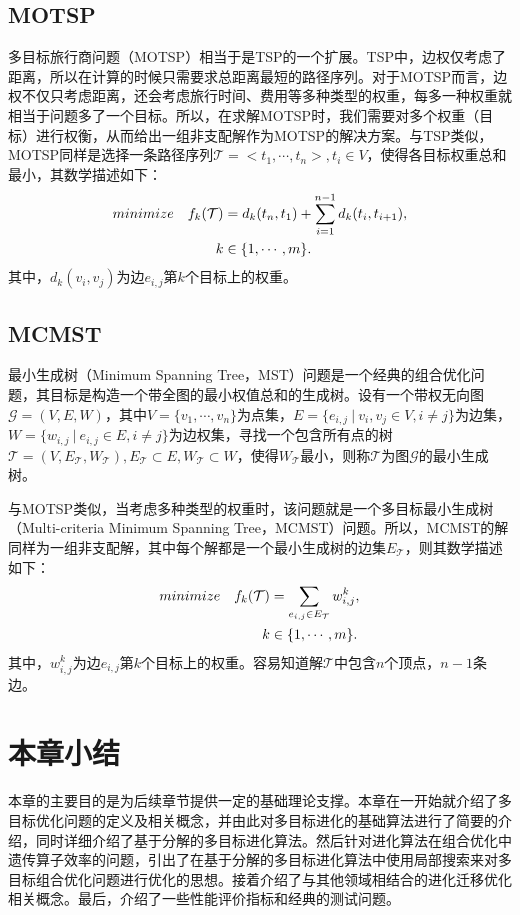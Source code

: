 \subsection{MOTSP}
\label{subsec:背景介绍:测试问题:MOTSP}
多目标旅行商问题（MOTSP）相当于是TSP的一个扩展。TSP中，边权仅考虑了距离，所以在计算的时候只需要求总距离最短的路径序列。对于MOTSP而言，边权不仅只考虑距离，还会考虑旅行时间、费用等多种类型的权重，每多一种权重就相当于问题多了一个目标。所以，在求解MOTSP时，我们需要对多个权重（目标）进行权衡，从而给出一组非支配解作为MOTSP的解决方案。与TSP类似，MOTSP同样是选择一条路径序列$\mathcal{T} = <t_1, \cdots, t_n>, t_i \in V $，使得各目标权重总和最小，其数学描述如下：
\begin{align}
    \label{eq:MOTSP}
    minimize \quad f_k(\mathcal{T}) & = d_k(t_n,t_1) + \sum_{i=1}^{n-1} d_k(t_i,t_{i+1}), \\
    k & \in \{1, \cdots, m\}. \notag
\end{align}
其中，$d_k(v_i, v_j)$为边$e_{i,j}$第$k$个目标上的权重。

\subsection{MCMST}
\label{subsec:背景介绍:测试问题:MCMST}
最小生成树（Minimum Spanning Tree，MST）问题是一个经典的组合优化问题，其目标是构造一个带全图的最小权值总和的生成树。设有一个带权无向图$\mathcal{G}=(V,E,W)$，其中$V = \{ v_1, \cdots, v_n \}$为点集，$E = \{ e_{i,j} \ | \ v_i,v_j \in V, i \not = j \}$为边集，$W = \{ w_{i,j} \ | \ e_{i,j} \in E, i \not = j \}$为边权集，寻找一个包含所有点的树$\mathcal{T} = (V, E_{\mathcal{T}}, W_\mathcal{T}), E_{\mathcal{T}} \subset E,W_\mathcal{T} \subset W$，使得$W_\mathcal{T}$最小，则称$\mathcal{T}$为图$\mathcal{G}$的最小生成树。
\par
与MOTSP类似，当考虑多种类型的权重时，该问题就是一个多目标最小生成树（Multi-criteria Minimum Spanning Tree，MCMST）问题。所以，MCMST的解同样为一组非支配解，其中每个解都是一个最小生成树的边集$E_{\mathcal{T}}$，则其数学描述如下：
\begin{align}
    \label{eq:MCMST}
    minimize \quad f_k(\mathcal{T}) & = \sum_{e_{i,j} \in E_{\mathcal{T}}} w_{i,j}^k, \\
    k & \in \{1, \cdots, m\}. \notag
\end{align}
其中，$w_{i,j}^k$为边$e_{i,j}$第$k$个目标上的权重。容易知道解$\mathcal{T}$中包含$n$个顶点，$n-1$条边。

\section{本章小结}
\label{sec:背景介绍:本章小结}
本章的主要目的是为后续章节提供一定的基础理论支撑。本章在一开始就介绍了多目标优化问题的定义及相关概念，并由此对多目标进化的基础算法进行了简要的介绍，同时详细介绍了基于分解的多目标进化算法。然后针对进化算法在组合优化中遗传算子效率的问题，引出了在基于分解的多目标进化算法中使用局部搜索来对多目标组合优化问题进行优化的思想。接着介绍了与其他领域相结合的进化迁移优化相关概念。最后，介绍了一些性能评价指标和经典的测试问题。